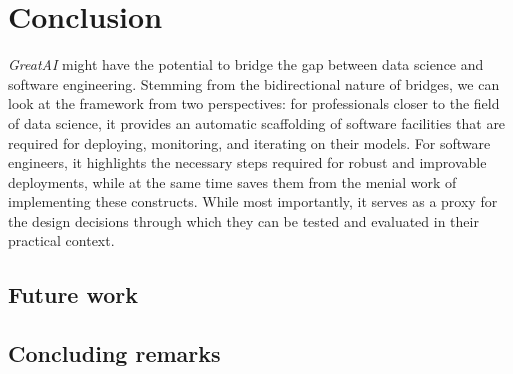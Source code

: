 \chapter{Conclusion}  \label{chapter:conclusion}


\textit{GreatAI} might have the potential to bridge the gap between data science and software engineering. Stemming from the bidirectional nature of bridges, we can look at the framework from two perspectives: for professionals closer to the field of data science, it provides an automatic scaffolding of software facilities that are required for deploying, monitoring, and iterating on their models. For software engineers, it highlights the necessary steps required for robust and improvable deployments, while at the same time saves them from the menial work of implementing these constructs. While most importantly, it serves as a proxy for the design decisions through which they can be tested and evaluated in their practical context.

\section{Future work}

\section{Concluding remarks}
